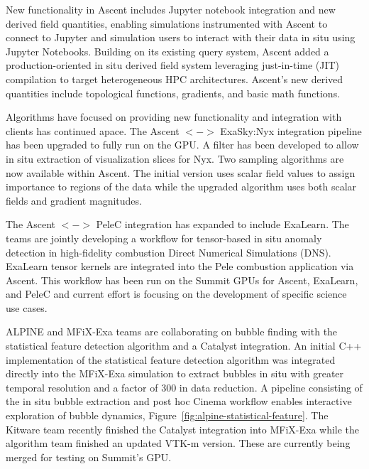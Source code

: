 New functionality in Ascent includes Jupyter notebook integration and new derived field quantities, enabling simulations instrumented with Ascent to connect to Jupyter and simulation users to interact with their data in situ using Jupyter Notebooks. 
Building on its existing query system, Ascent added a production-oriented in situ derived field system leveraging just-in-time (JIT) compilation to target heterogeneous HPC architectures.  Ascent's new derived quantities include topological functions, gradients, and basic math functions.  

Algorithms have  focused on providing new functionality and integration with clients has continued apace.  The Ascent $<->$ ExaSky:Nyx integration pipeline has been upgraded to fully run on the GPU.  A filter has been developed to allow in situ extraction of visualization slices for Nyx.  Two sampling algorithms are now available within Ascent.  The initial version uses scalar field values to assign importance to regions of the data while the upgraded algorithm uses both scalar fields and gradient magnitudes.  

The Ascent $<->$ PeleC integration has expanded to include ExaLearn.  The teams are  jointly developing a workflow for tensor-based in situ anomaly detection in high-fidelity combustion Direct Numerical Simulations (DNS).  ExaLearn tensor kernels are integrated into the Pele combustion application via Ascent.  This workflow has been run on the Summit GPUs for Ascent, ExaLearn, and PeleC and current effort is focusing on the development of specific science use cases.

ALPINE and MFiX-Exa teams are collaborating on bubble finding with the statistical feature detection algorithm and a Catalyst integration.  An initial C++ implementation of the statistical feature detection algorithm was integrated directly into the MFiX-Exa simulation to extract bubbles in situ with greater temporal resolution and a factor of 300 in data reduction.  A pipeline consisting of the in situ bubble extraction and post hoc Cinema workflow enables interactive exploration of bubble dynamics, Figure~\ref{fig:alpine-statistical-feature}.  The Kitware team recently finished the Catalyst integration into MFiX-Exa while the algorithm team finished an updated VTK-m version.  These are currently being merged for testing on Summit's GPU.  


